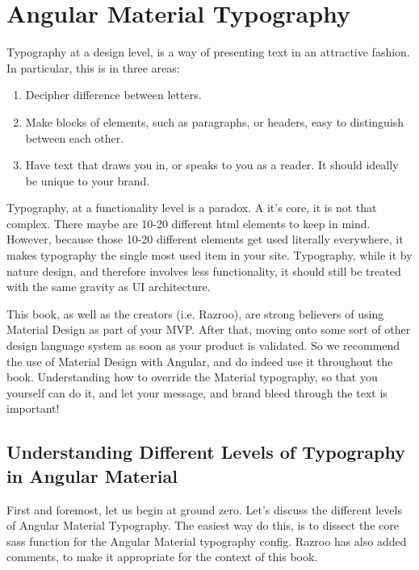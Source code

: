 \chapter{ Angular Material Typography }

Typography at a design level, is a way of presenting text in an attractive 
fashion. In particular, this is in three areas: 
\begin{enumerate}
  \item Decipher difference between letters.
  \item Make blocks of elements, such as paragraphs, or headers, easy to 
  distinguish between each other. 
  \item Have text that draws you in, or speaks to you as a reader. It 
  should ideally be unique to your brand.
\end{enumerate}

Typography, at a functionality level is a paradox. A it's core, it is 
not that complex. There maybe are 10-20 different html elements to keep in
mind. However, because those 10-20 different elements get used literally 
everywhere, it makes typography the single most used item in your site. Typography,
while it by nature design, and therefore involves less functionality, it should 
still be treated with the same gravity as UI architecture. 

This book, as well as the creators (i.e. Razroo), are strong believers of 
using Material Design as part of your MVP. After that, moving onto some sort 
of other design language system as soon as your product is validated. So 
we recommend the use of Material Design with Angular, and do indeed use it
throughout the book. Understanding how to override the Material typography,
so that you yourself can do it, and let your message, and brand bleed 
through the text is important!

\section{Understanding Different Levels of Typography in Angular Material}
First and foremost, let us begin at ground zero. Let's discuss the different 
levels of Angular Material Typography. The easiest way do this, is to dissect 
the core sass function for the Angular Material typography config. Razroo has 
also added comments, to make it appropriate for the context of this book.

